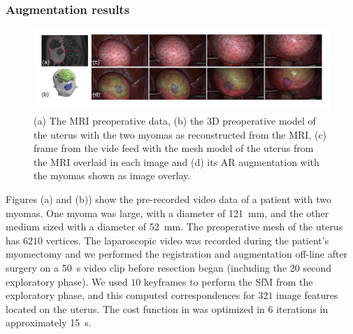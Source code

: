 \subsubsection{Augmentation results}
\begin{figure}[t]
  \centering
  \includegraphics[width=\textwidth]{./figs/frames_aug.pdf}
\caption{(a) The MRI preoperative data, (b) the 3D preoperative model of the uterus with the two myomas as reconstructed from the MRI, (c) frame from the vide feed with the mesh model of the uterus from the MRI overlaid in each image and (d) its AR augmentation with the myomas shown as image overlay.}
\label{fig:myomas}
\end{figure}
Figures (a) and (b)) show the pre-recorded video data of a patient with two myomas. One myoma was large, with a diameter of \SI{121}{\milli\metre}, and the other medium sized with a diameter of \SI{52}{\milli\metre}. The preoperative mesh of the uterus has $6210$ vertices.
The laparoscopic video was recorded during the patient's myomectomy and we performed the registration and augmentation off-line after surgery on a \SI{50}{\second} video clip before resection began (including the 20 second exploratory phase). We used $10$ keyframes to perform the SfM from the exploratory phase, and this computed correspondences for $321$ image features located on the uterus. The cost function in  was optimized in $6$ iterations in approximately \SI{15}{\second}.%
